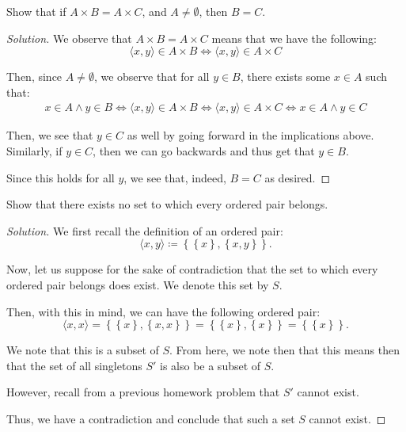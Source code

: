 \documentclass{article}
\newenvironment{solution}{\begin{proof}[Solution]}{\end{proof}}
\newcommand{\brc}[1]{ \left\{  {#1} \right\}}
\newcommand{\ang}[1]{\langle {#1} \rangle}
\begin{document}
	\begin{ahw}
		Show that if $A \times B = A \times C$, and $A \neq \emptyset$, then $B = C$.
	\end{ahw}
	\begin{solution}
		We observe that $A \times B = A \times C$ means that we have the following:
		\begin{equation*}
			\ang{x,y} \in A \times B \iff \ang{x,y} \in A \times C
		\end{equation*}
		
		Then, since $A \neq \emptyset$, we observe that for all $y \in B$, there exists some $x \in A$ such that:
		\begin{align*}
			x \in A \land y \in B \iff \ang{x,y} \in A \times B \iff \ang{x,y} \in A \times C \iff x \in A \land y \in C
		\end{align*}
		
		Then, we see that $y \in C$ as well by going forward in the implications above. Similarly, if $y \in C$, then we can go backwards and thus get that $y \in B$.
		
		Since this holds for all $y$, we see that, indeed, $B = C$ as desired.
	\end{solution}
	
	\setcounter{subsection}{4}
	\begin{hw}
		Show that there exists no set to which every ordered pair belongs.
	\end{hw}
	\begin{solution}
		We first recall the definition of an ordered pair:
		\begin{equation*}
			\ang{x,y} \coloneq \brc{ \brc{x}, \brc{x,y}}.
		\end{equation*}
		
		Now, let us suppose for the sake of contradiction that the set to which every ordered pair belongs does exist. We denote this set by $S$.
		
		Then, with this in mind, we can have the following ordered pair:
		\begin{equation*}
			\ang{x,x} = \brc{ \brc{x}, \brc{x,x}} = \brc{ \brc{x}, \brc{x}} = \brc{ \brc{x}}.
		\end{equation*} 
		
		We note that this is a subset of $S$. From here, we note then that this means then that the set of all singletons $S'$ is also be a subset of $S$.
		
		However, recall from a previous homework problem that $S'$ cannot exist.
		
		Thus, we have a contradiction and conclude that such a set $S$ cannot exist.
	\end{solution}
	
\end{document}
